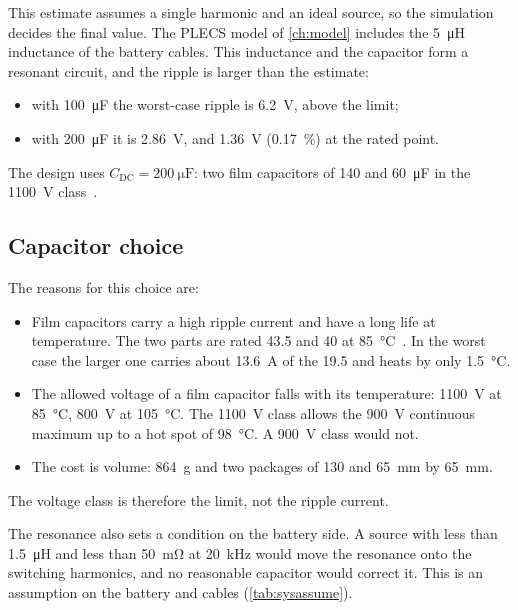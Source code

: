 This estimate assumes a single harmonic and an ideal source, so the
simulation decides the final value. The PLECS model of \cref{ch:model} includes the \SI{5}{\micro\henry}
inductance of the battery cables. This inductance and the capacitor form a
resonant circuit, and the ripple is larger than the estimate:
\begin{itemize}
  \item with \SI{100}{\micro\farad} the worst-case ripple is
        \SI{6.2}{\volt}, above the limit;
  \item with \SI{200}{\micro\farad} it is \SI{2.86}{\volt}, and
        \SI{1.36}{\volt} (\SI{0.17}{\percent}) at the rated point.
\end{itemize}
The design uses $C_\mathrm{DC} = \SI{200}{\micro\farad}$: two film capacitors
of \SI{140}{} and \SI{60}{\micro\farad} in the \SI{1100}{\volt}
class~\cite{vishay_mkp1848}.

\subsection{Capacitor choice}

The reasons for this choice are:
\begin{itemize}
  \item Film capacitors carry a high ripple current and have a long life at
        temperature. The two parts are rated \SI{43.5}{} and
        \SI{40}{\Arms} at \SI{85}{\celsius}~\cite{vishay_mkp1848}. In the
        worst case the larger one carries about \SI{13.6}{\ampere} of the
        \SI{19.5}{} and heats by only \SI{1.5}{\celsius}.
  \item The allowed voltage of a film capacitor falls with its temperature:
        \SI{1100}{\volt} at \SI{85}{\celsius}, \SI{800}{\volt} at
        \SI{105}{\celsius}. The \SI{1100}{\volt} class allows the
        \SI{900}{\volt} continuous maximum up to a hot spot of
        \SI{98}{\celsius}. A \SI{900}{\volt} class would not.
  \item The cost is volume: \SI{864}{\gram} and two packages of
        \SI{130}{} and \SI{65}{\milli\metre} by \SI{65}{\milli\metre}.
\end{itemize}
The voltage class is therefore the limit, not the ripple current.

The resonance also sets a condition on the battery side. A source with less
than \SI{1.5}{\micro\henry} and less than \SI{50}{\milli\ohm} at
\SI{20}{\kilo\hertz} would move the resonance onto the switching harmonics,
and no reasonable capacitor would correct it. This is an assumption on the
battery and cables (\cref{tab:sysassume}).

